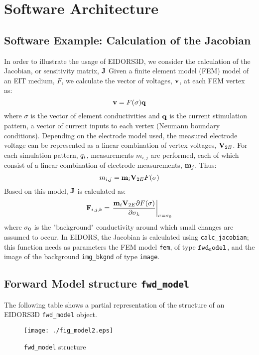 \documentclass[12pt]{iopart}
\begin{document}
\section{Software Architecture}

\subsection{Software Example: Calculation of the Jacobian}
In order to illustrate the usage of EIDORS3D, we consider
the calculation of the Jacobian, or sensitivity matrix,
$\bf J$
Given a finite element model (FEM) model of an EIT medium,
$F$, we calculate the vector of voltages, $\bf v$, 
at each FEM vertex as:
\begin{equation}
{\bf v} = F( \sigma ){\bf q} 
\end{equation}
where $\sigma$ is the vector of element conductivities
and $\bf q$ is the current stimulation pattern, a vector
of current inputs to each vertex (Neumann boundary conditions).
Depending on the electrode model used, the measured electrode
voltage can be represented as a linear combination of vertex
voltages, ${\bf V}_{2E}$.
For each simulation pattern, ${\bf }q_{i}$,
measurements $m_{i,j}$
are performed, each of which consist of a linear combination of
electrode measurements, ${\bf m}_j$.
Thus:
\begin{equation}
m_{i,j} = {\bf m}_{i} {\bf V}_{2E} F( \sigma )
\end{equation}
Based on this model, $\bf J$ is calculated as:
\begin{equation}
{\bf F}_{i,j,k} = \left.\frac{
 {\bf m}_{i} {\bf V}_{2E}{\partial}F( \sigma )
}{
{\partial}{\bf \sigma}_k
}
\right|_{
   {\bf \sigma} = {\bf \sigma}_0 
}
\end{equation}
where ${\bf \sigma}_0$ is the "background"
conductivity around which small changes are assumed to occur.
In EIDORS, the Jacobian is calculated using {\tt calc\_jacobian};
this function needs as parameters the FEM model {\tt fem},
of type $\tt fwd_model$,
and the image of the background {\tt img\_bkgnd}
of type {\tt image}.

\subsection{Forward Model structure {\tt fwd\_model} }

The following table shows a partial representation of 
the structure of an EIDORS3D {\tt fwd\_model} object.

%
%
\begin{figure}[th]
\begin{flushright}
\texttt{[image: ./fig\_model2.eps]}
\caption{\small {\tt fwd\_model} structure
 }
\end{flushright}
\end{figure}
\end{document}
